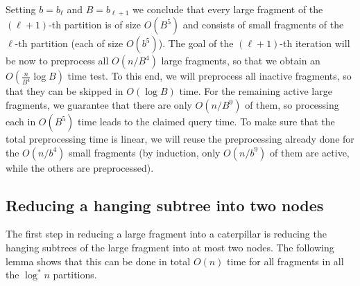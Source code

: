 \documentclass[11pt,a4paper]{article}
\theoremstyle{definition}
\theoremstyle{remark}
\begin{document}
Setting $b=b_{\ell}$ and $B=b_{\ell+1}$  we conclude that every large fragment of the $(\ell+1)$-th partition is of size $O(B^5)$ and consists
of small fragments of the $\ell$-th partition (each of size $O(b^5)$). 
The goal of the $(\ell+1)$-th iteration will be now to preprocess all $O(n/B^{4})$ large fragments, so that we obtain an $O(\frac{n}{B^{4}}\log B)$
time test. To this end, we will preprocess all inactive fragments, so that they can be skipped in $O(\log B)$ time. For the remaining active
large fragments, we guarantee that there are only $O(n/B^{9})$ of them, so processing each in $O(B^{5})$ time leads
to the claimed query time. To make sure that the total preprocessing time is linear, we will reuse the preprocessing already done
for the $O(n/b^{4})$ small fragments (by induction, only $O(n/b^{9})$ of them are active, while the others are preprocessed).

\subsection{Reducing a hanging subtree into two nodes}\label{section:lemma1}
The first step in reducing a large fragment into a caterpillar is reducing the hanging subtrees of the large fragment into at most two nodes. The following lemma shows that this can be done in total $O(n)$ time for all fragments in all the $\log^* n$ partitions.
\end{document}
